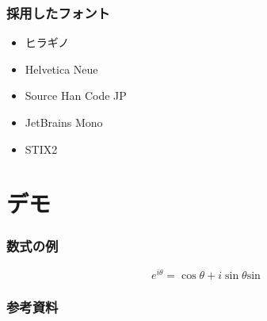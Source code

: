 \documentclass[unicode, 14pt, aspectratio=169]{beamer}
\begin{document}

\begin{frame}
\frametitle{採用したフォント}
\begin{itemize}
\item ヒラギノ
\item Helvetica Neue
\item Source Han Code JP
\item JetBrains Mono
\item STIX2
\end{itemize}
\end{frame}

\section{デモ}

\begin{frame}
  \frametitle{数式の例}
  \begin{equation}
    e^{i\theta} = \cos\theta + i\sin \theta \mathrm{sin}
  \end{equation}
\end{frame}



\begin{frame}[allowframebreaks]
  \frametitle{参考資料}
  \printbibliography
  \nocite{*} 
\end{frame}
\end{document}
